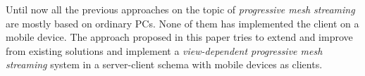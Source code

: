 Until now all the previous approaches on the topic of \emph{progressive mesh streaming} are mostly based on ordinary PCs. None of them has implemented the client on a mobile device. The approach proposed in this paper tries to extend and improve from existing solutions and implement a \emph{view-dependent progressive mesh streaming} system in a server-client schema with mobile devices as clients. 




